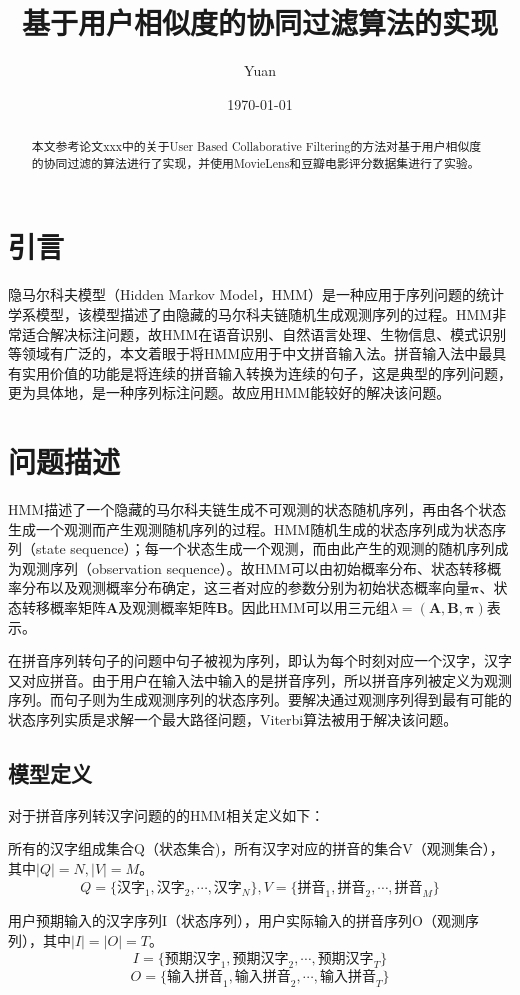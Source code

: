 \documentclass[12pt,a4paper]{ctexart}
\title{基于用户相似度的协同过滤算法的实现}
\author{Yuan}
\date{\small\today}
\begin{document}
\maketitle
\begin{abstract}
本文参考论文xxx中的关于User Based Collaborative Filtering的方法对基于用户相似度的协同过滤的算法进行了实现，并使用MovieLens和豆瓣电影评分数据集进行了实验。
\end{abstract}	
\section{引言}
隐马尔科夫模型（Hidden Markov Model，HMM）是一种应用于序列问题的统计学系模型，该模型描述了由隐藏的马尔科夫链随机生成观测序列的过程。HMM非常适合解决标注问题，故HMM在语音识别、自然语言处理、生物信息、模式识别等领域有广泛的\cite{李航统计学习}，本文着眼于将HMM应用于中文拼音输入法。拼音输入法中最具有实用价值的功能是将连续的拼音输入转换为连续的句子，这是典型的序列问题，更为具体地，是一种序列标注问题。故应用HMM能较好的解决该问题。
\section{问题描述}
HMM描述了一个隐藏的马尔科夫链生成不可观测的状态随机序列，再由各个状态生成一个观测而产生观测随机序列的过程。HMM随机生成的状态序列成为状态序列（state sequence）；每一个状态生成一个观测，而由此产生的观测的随机序列成为观测序列（observation sequence）。故HMM可以由初始概率分布、状态转移概率分布以及观测概率分布确定，这三者对应的参数分别为初始状态概率向量$ \bm{\pi} $、状态转移概率矩阵$\bm{A}$及观测概率矩阵$\bm{B}$。因此HMM可以用三元组$ \lambda=(\bm{A},\bm{B},\bm{\pi}) $表示\cite{李航统计学习}。

在拼音序列转句子的问题中句子被视为序列，即认为每个时刻对应一个汉字，汉字又对应拼音。由于用户在输入法中输入的是拼音序列，所以拼音序列被定义为观测序列。而句子则为生成观测序列的状态序列。要解决通过观测序列得到最有可能的状态序列实质是求解一个最大路径问题，Viterbi算法\cite{viterbi2006a}被用于解决该问题。
\subsection{模型定义}
对于拼音序列转汉字问题的的HMM相关定义如下：


所有的汉字组成集合Q（状态集合)，所有汉字对应的拼音的集合V（观测集合），其中$ |Q|=N, |V|=M $。
\[ Q=\{ \mbox{汉字}_1,\mbox{汉字}_2,\cdots,\mbox{汉字}_N \},V=\{ \mbox{拼音}_1,\mbox{拼音}_2,\cdots,\mbox{拼音}_M \}  \]

用户预期输入的汉字序列I（状态序列），用户实际输入的拼音序列O（观测序列），其中$ |I|=|O|=T $。
\[ I=\{ \mbox{预期汉字}_1,\mbox{预期汉字}_2,\cdots,\mbox{预期汉字}_T \}	\]
\[O=\{ \mbox{输入拼音}_1,\mbox{输入拼音}_2,\cdots,\mbox{输入拼音}_T \}  \]
\end{document}
